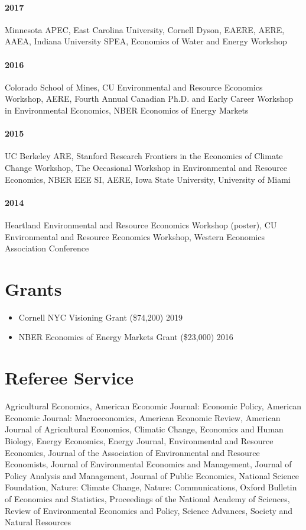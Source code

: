 \documentclass{res} %
\begin{document}
\begin{resume}
\paragraph{2017} Minnesota APEC, East Carolina University, Cornell Dyson, EAERE, AERE, AAEA, Indiana University SPEA, Economics of Water and Energy Workshop \vspace{-.3in}
\paragraph{2016} Colorado School of Mines, CU Environmental and Resource Economics Workshop, AERE, Fourth Annual Canadian Ph.D. and Early Career Workshop in Environmental Economics, NBER Economics of Energy Markets \vspace{-.3in}
\paragraph{2015} UC Berkeley ARE, Stanford Research Frontiers in the Economics of Climate Change Workshop, The Occasional Workshop in Environmental and Resource Economics, NBER EEE SI, AERE, Iowa State University, University of Miami \vspace{-.3in}
\paragraph{2014} Heartland Environmental and Resource Economics Workshop (poster), CU Environmental and Resource Economics Workshop, Western Economics Association Conference

\vspace{-.075in}
\section{Grants}
	\begin{itemize}  \itemsep -1pt
		\item[] Cornell NYC Visioning Grant (\$74,200) \hfill 2019
		\item[] NBER Economics of Energy Markets Grant (\$23,000) \hfill 2016
	\end{itemize}
\vspace{-.075in}
\section{Referee Service}
	Agricultural Economics, American Economic Journal: Economic Policy, American Economic Journal: Macroeconomics, American Economic Review, American Journal of Agricultural Economics, Climatic Change, Economics and Human Biology, Energy Economics, Energy Journal, Environmental and Resource Economics, Journal of the Association of Environmental and Resource Economists, Journal of Environmental Economics and Management, Journal of Policy Analysis and Management, Journal of Public Economics, National Science Foundation, Nature: Climate Change, Nature: Communications, Oxford Bulletin of Economics and Statistics, Proceedings of the National Academy of Sciences, Review of Environmental Economics and Policy, Science Advances, Society and Natural Resources


\end{resume}
\end{document}
